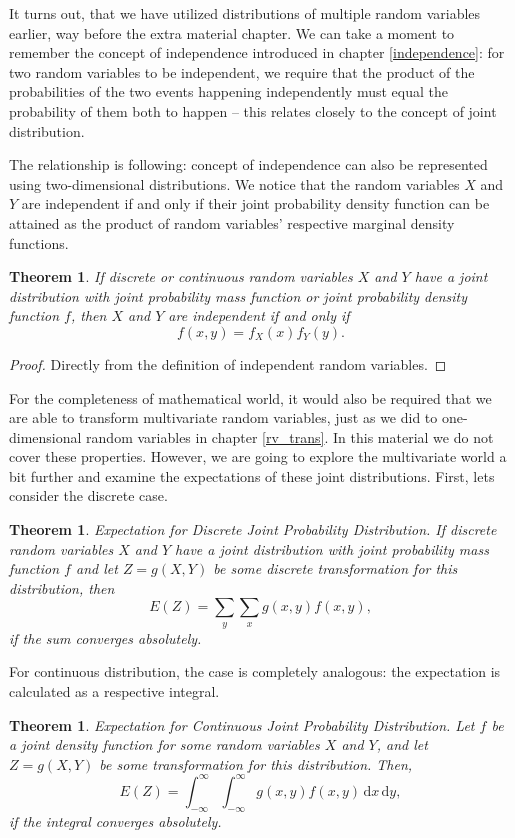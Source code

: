 \documentclass[12pt,a4paper,leqno]{report}
\newcommand{\dif}{\,\mathrm{d}}
\theoremstyle{plain}
\newtheorem{lause}[equation]{Theorem}
\theoremstyle{definition}
\begin{document}
It turns out, that we have utilized distributions of multiple random variables earlier, way before the extra material chapter. We can take a moment to remember the concept of independence introduced in chapter \ref{independence}: for two random variables to be independent, we require that the product of the probabilities of the two events happening independently must equal the probability of them both to happen -- this relates closely to the concept of joint distribution.

The relationship is following: concept of independence can also be represented using two-dimensional distributions. We notice that the random variables $X$ and $Y$ are independent if and only if their joint probability density function can be attained as the product of random variables' respective marginal density functions.

\begin{lause}
If discrete or continuous random variables $X$ and $Y$ have a joint distribution with joint probability mass function or joint probability density function $f$, then $X$ and $Y$ are independent if and only if
\[
f(x,y) = f_X(x)f_Y(y).
\]
\end{lause}
\begin{proof}
Directly from the definition of independent random variables.
\end{proof}

For the completeness of mathematical world, it would also be required that we are able to transform multivariate random variables, just as we did to one-dimensional random variables in chapter \ref{rv_trans}. In this material we do not cover these properties. However, we are going to explore the multivariate world a bit further and examine the expectations of these joint distributions. First, lets consider the discrete case.

\begin{lause}
Expectation for Discrete Joint Probability Distribution. If discrete random variables $X$ and $Y$ have a joint distribution with joint probability mass function $f$ and let $Z = g(X, Y)$ be some discrete transformation for this distribution, then
\[
E(Z) = \sum_y\sum_x g(x,y)f(x,y),
\]
if the sum converges absolutely.
\end{lause}

For continuous distribution, the case is completely analogous: the expectation is calculated as a respective integral.

\begin{lause} \label{lause:2dim-expectation}
Expectation for Continuous Joint Probability Distribution. Let $f$ be a joint density function for some random variables $X$ and $Y$, and let $Z = g(X,Y)$ be some transformation for this distribution. Then,
\[
E(Z) = \int_{-\infty}^{\infty}\int_{-\infty}^{\infty}g(x,y)f(x,y) \dif{x} \dif{y},
\]
if the integral converges absolutely.
\end{lause}
\end{document}
